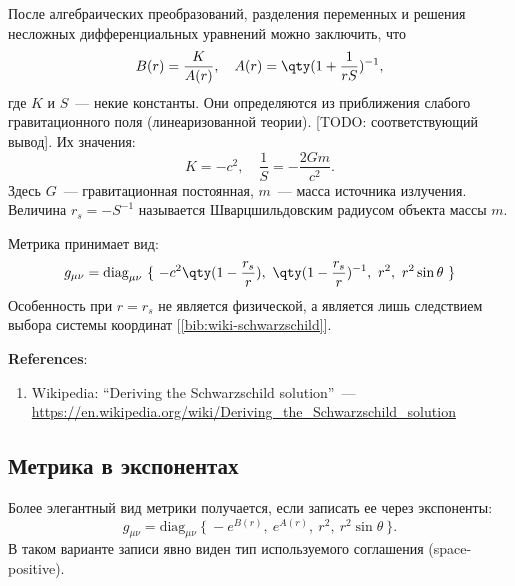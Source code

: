 \documentclass[\docroot/reports/draft/report.tex]{subfiles}
\begin{document}
    После алгебраических преобразований, разделения переменных и решения несложных дифференциальных уравнений можно заключить, что
    \begin{equation*}
        B(r) = \frac{K}{A(r)} , \quad A(r) = \qty(1 + \frac{1}{r S})^{-1} ,
    \end{equation*}
    где $K$ и $S$~--- некие константы. Они определяются из приближения слабого гравитационного поля (линеаризованной теории). [TODO: соответствующий вывод]. Их значения:
    \begin{equation*}
        K = -c^2, \quad \frac{1}{S} = - \frac{2 G m}{c^2} .
    \end{equation*}
    Здесь $G$~--- гравитационная постоянная, $m$~--- масса источника излучения. Величина $r_s = - S^{-1}$ называется Шварцшильдовским радиусом объекта массы $m$.

    Метрика принимает вид:
    \begin{equation*}
        g_{\mu\nu} = \text{diag}_{\mu\nu}\ \{\
            -c^2 \qty(1 - \frac{r_s}{r}),\
            \qty(1 - \frac{r_s}{r})^{-1},\
            r^2,\
            r^2 \sin\theta
        \ \}
    \end{equation*}
    Особенность при $r = r_s$ не является физической, а является лишь следствием выбора системы координат [\ref{bib:wiki-schwarzschild}].

    \vspace{1cm}

    \textbf{\Large{References}}:
    \begin{enumerate}
        \item \label{bib:wiki-schwarzschild} Wikipedia: \enquote{Deriving the Schwarzschild solution}~--- \url{https://en.wikipedia.org/wiki/Deriving_the_Schwarzschild_solution}
    \end{enumerate}

\subsection{Метрика в экспонентах}

    Более элегантный вид метрики получается, если записать ее через экспоненты:
    \begin{equation*}
        g_{\mu\nu} = \text{diag}_{\mu\nu}\ \{\ -e^{B(r)},\ e^{A(r)},\ r^2,\ r^2 \sin\theta \ \} .
    \end{equation*}
    В таком варианте записи явно виден тип используемого соглашения (space-positive).
\end{document}
